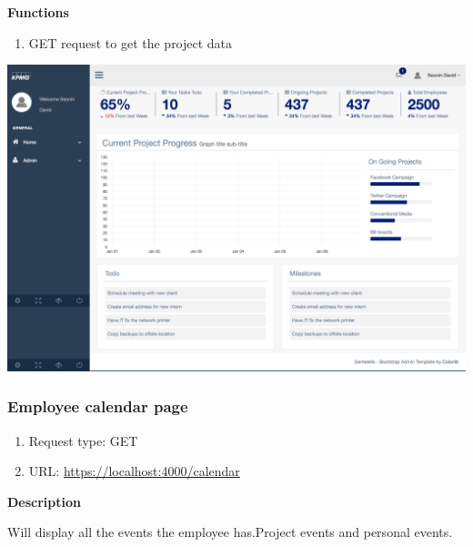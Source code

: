 \documentclass[a4paper,12pt]{article}
\begin{document}
				\textbf{Functions}
				\begin{flushright}
				    \begin{enumerate}
				    	\item GET request to get the project data
				     \end{enumerate}
				\end{flushright}
				\includegraphics[width=0.99\linewidth]{Images/employee-dash.png}
				
			    \subsubsection{Employee calendar page}
		 		\begin{enumerate}
				 	\item Request type: GET
				 	\item URL: \url{https://localhost:4000/calendar}
				 \end{enumerate}
				
				\textbf{Description}
				\begin{flushright}
				 Will display all the events the employee has.Project events and personal events.
				\end{flushright}
				
\end{document}
